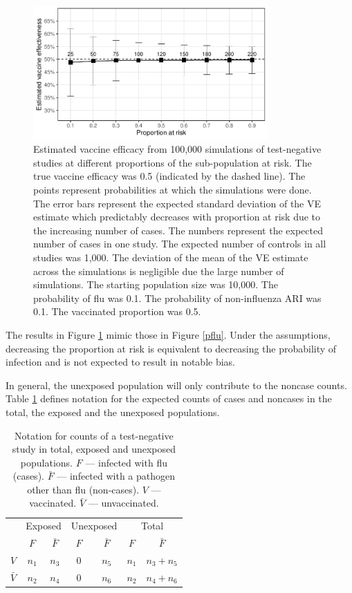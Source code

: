 \documentclass[12pt]{article}
\begin{document}
\begin{figure}[htp]
	\centering
	\includegraphics[width=0.8\textwidth]{../graph/prisk.pdf}
	\caption{
	Estimated vaccine efficacy from 100,000 simulations of test-negative studies at different proportions of the sub-population at risk. The true vaccine efficacy was 0.5 (indicated by the dashed line). The points represent probabilities at which the simulations were done. The error bars represent the expected standard deviation of the VE estimate which predictably decreases with proportion at risk due to the increasing number of cases. The numbers represent the expected number of cases in one study. The expected number of controls in all studies was 1,000. The deviation of the mean of the VE estimate across the simulations is negligible due the large number of simulations. The starting population size was 10,000. The probability of flu was 0.1. The probability of non-influenza ARI was 0.1. The vaccinated proportion was 0.5.
	}
	\label{prisk}
\end{figure}

The results in Figure \ref{prisk} mimic those in Figure \ref{pflu}. Under the assumptions, decreasing the proportion at risk is equivalent to decreasing the probability of infection and is not expected to result in notable bias.

In general, the unexposed population will only contribute to the noncase counts. Table \ref{ExpCounts} defines notation for the expected counts of cases and noncases in the total, the exposed and the unexposed populations.

\pagebreak

\begin{table}[htp]
\centering
\caption{
	Notation for counts of a test-negative study in total, exposed and unexposed populations. $F$ --- infected with flu (cases). $\bar{F}$ --- infected with a pathogen other than flu (non-cases). $V$ --- vaccinated. $\bar{V}$ --- unvaccinated.
	\label{ExpCounts}
}
\begin{tabular}{ccc|cc|cc}
	\toprule
	& \multicolumn{2}{c}{Exposed} & \multicolumn{2}{c}{Unexposed} & \multicolumn{2}{c}{Total} \\
	& $F$ & $\bar{F}$ & $F$ & $\bar{F}$ & $F$ & $\bar{F}$ \\
	$V$ & $n_1$ & $n_3$ & $0$ & $n_5$ & $n_1$ & $n_3 + n_5$ \\
	$\bar{V}$ & $n_2$ & $n_4$ & $0$ & $n_6$ & $n_2$ & $n_4 + n_6$ \\
	\bottomrule
\end{tabular}
\end{table}
\end{document}
